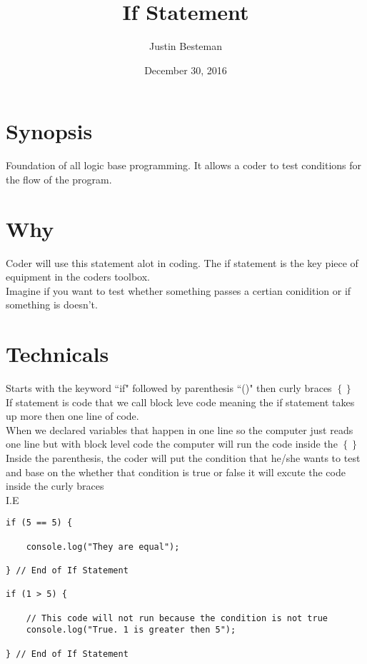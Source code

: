 \documentclass[12pt, letterpaper]{article}
\title{If Statement}
\author{Justin Besteman}
\date{December 30, 2016}
\begin{document}
\maketitle


\section*{Synopsis}

Foundation of all logic base programming. It allows a coder to test conditions for the flow of the program.

\section*{Why}

Coder will use this statement alot in coding. The if statement is the key piece of equipment in the coders toolbox.\\
Imagine if you want to test whether something passes a certian conidition or if something is doesn't.\\

\section*{Technicals}

Starts with the keyword ``if" followed by parenthesis ``()" then curly braces $\left\{\right\}$ \\
If statement is code that we call block leve code meaning the if statement takes up more then one line of code.\\
When we declared variables that happen in one line so the computer just reads one line but with block level code the computer will run the code inside the $\left\{\right\}$ \\
Inside the parenthesis, the coder will put the condition that he/she wants to test and base on the whether that condition is true or false it will excute the code inside the curly braces \\
I.E\\
\begin{lstlisting}
if (5 == 5) {

	console.log("They are equal");

} // End of If Statement

if (1 > 5) {

	// This code will not run because the condition is not true
	console.log("True. 1 is greater then 5");

} // End of If Statement
\end{lstlisting}
\end{document}
